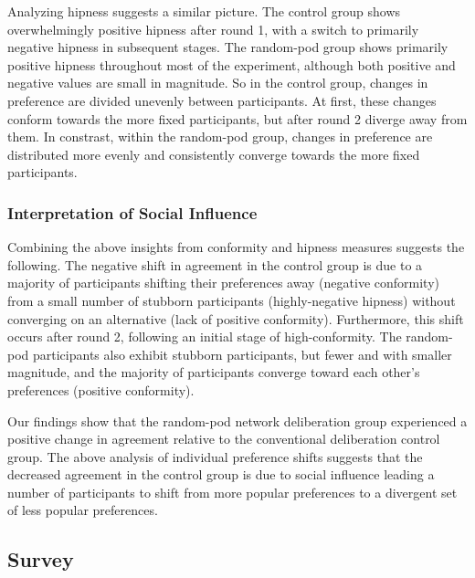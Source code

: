 {Analyzing hipness suggests a similar picture.
The control group shows overwhelmingly positive hipness after round 1, with a switch to primarily negative hipness in subsequent stages.
The random-pod group shows primarily positive hipness throughout most of the experiment, although both positive and negative values are small in magnitude.
So in the control group, changes in preference are divided unevenly between participants.
At first, these changes conform towards the more fixed participants, but after round 2 diverge away from them.
In constrast, within the random-pod group, changes in preference are distributed more evenly and consistently converge towards the more fixed participants.

\subsubsection{Interpretation of Social Influence}
\label{sec:res-interpretation}

Combining the above insights from conformity and hipness measures suggests the following.
The negative shift in agreement in the control group is due
to a majority of participants shifting their preferences away (negative conformity) from a small number of stubborn participants (highly-negative hipness) without converging on an alternative (lack of positive conformity).
Furthermore, this shift occurs after round 2, following an initial stage of high-conformity.
The random-pod participants also exhibit stubborn participants, but fewer and with smaller magnitude,
and the majority of participants converge toward each other's preferences (positive conformity).

Our findings show that the random-pod network deliberation group experienced a positive change in agreement relative to the conventional deliberation control group.
The above analysis of individual preference shifts suggests that the decreased agreement in the control group is due to social influence leading a number of participants to shift from more popular preferences to a divergent set of less popular preferences.

\subsection{Survey}

}
